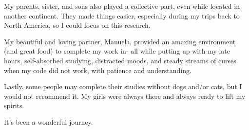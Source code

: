 \begin{acknowledgements}
My parents, sister, and sons also played a collective part, even while located in another continent. They made things easier, especially during my trips back to North America, so I could focus on this research. 

My beautiful and loving partner, Manuela, provided an amazing environment (and great food) to complete my work in- all while putting up with my late hours, self-absorbed studying, distracted moods, and steady streams of curses when my code did not work, with patience and understanding.

Lastly, some people may complete their studies without dogs and/or cats, but I would not recommend it. My girls were always there and always ready to lift my spirits.

It's been a wonderful journey.


\end{acknowledgements}
\dsp

